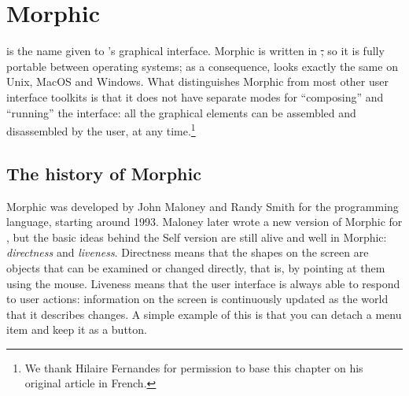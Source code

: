 \documentclass[a4paper,10pt,twoside]{book}
\begin{document}
	\renewcommand{\nnbb}[2]{} %
	\sloppy
\fi
\chapter{Morphic}


 is the name given to \sq's graphical interface.
Morphic is written in \st, so it is fully portable between operating systems; as a consequence, \sq looks exactly the same on Unix, MacOS and Windows.
What distinguishes Morphic from most other user interface toolkits is that it does not have separate modes for ``composing'' and ``running'' the interface: all the graphical elements can be assembled and disassembled by the user, at any time.\footnote{We thank Hilaire Fernandes for permission to base this chapter on his original article in French.}



\section{The history of Morphic}

Morphic was developed by John Maloney and Randy Smith for the  programming language, starting around 1993. 
Maloney later wrote a new version of Morphic for \sq, but the basic ideas behind the Self version are still alive and well in \sq Morphic: \emph{directness} and \emph{liveness}.
Directness means that the shapes on the screen are objects that can be examined or changed directly, that is, by pointing at them using the mouse.
Liveness means that the user interface is always able to respond to user actions: information on the screen is continuously updated as the world that it describes changes.
A simple example of this is that you can detach a menu item and keep it as a button.
\end{document}
